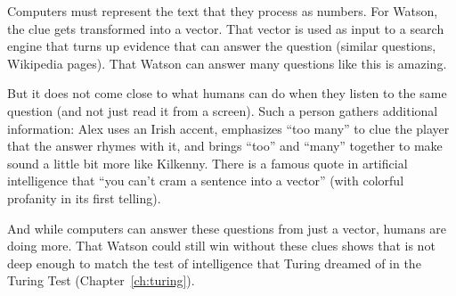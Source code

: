 Computers must represent the text that they process as numbers.
%
For Watson, the clue  gets transformed into a
vector.
%
That vector is used as input to a search engine that turns up evidence
that can answer the question (similar questions, Wikipedia pages).
%
That Watson can answer many questions like this is amazing.


But it does not come close to what humans can do when they listen to
the same question (and not just read it from a screen).
% 
Such a person gathers additional
information: Alex uses an Irish accent, emphasizes ``too many'' to
clue the player that the answer rhymes with it, and brings ``too'' and
``many'' together to make sound a little bit more like Kilkenny.
%
There is a famous quote in artificial intelligence that ``you can't
cram a sentence into a vector'' (with colorful profanity in its first
telling).

And while computers can answer these questions from just a vector,
humans are doing more.
%
That Watson could still win without these clues shows that \jeopardy{}
is not deep enough to match the test of intelligence that Turing
dreamed of in the Turing Test (Chapter~\ref{ch:turing}).
